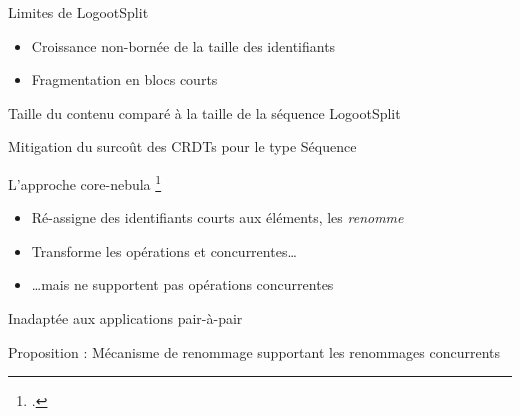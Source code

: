 \begin{frame}{Limites de LogootSplit}
    \begin{itemize}
        \item Croissance non-bornée de la taille des identifiants
        \item Fragmentation en blocs courts
    \end{itemize}
    \begin{block}{Taille du contenu comparé à la taille de la séquence LogootSplit}
        \begin{figure}
        \end{figure}
    \end{block}
\end{frame}

\begin{frame}{Mitigation du surcoût des CRDTs pour le type Séquence}
    \begin{block}{L'approche core-nebula \footcite{zawirski:hal-01248197}}
        \begin{itemize}
            \item Ré-assigne des identifiants courts aux éléments, \ie les \emph{renomme}
            \item Transforme les opérations \ins et \rmv concurrentes\dots
            \item \dots mais ne supportent pas opérations \ren concurrentes
        \end{itemize}
    \end{block}
    \begin{center}
        \alert{Inadaptée aux applications pair-à-pair}
    \end{center}
\end{frame}

\begin{frame}[standout]
    Proposition : Mécanisme de renommage supportant les renommages concurrents
\end{frame}
